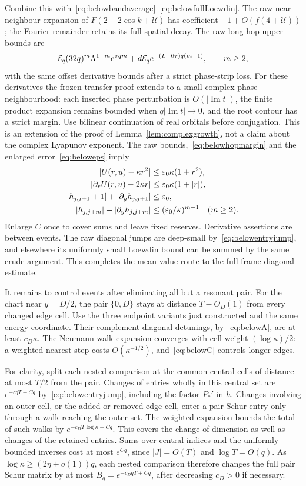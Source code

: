 Combine this with~\eqref{eq:belowbandaverage}--\eqref{eq:belowfullLoewdin}. The raw near-neighbour expansion of $F(2-2\cos k+\mathcal U)$ has coefficient $-1+O(f(4+\mathcal U))$; the Fourier remainder retains its full spatial decay. The raw long-hop upper bounds are
\[
 \mathcal E_q(32q)^m\Lambda^{1-m}e^{\tau qm}
       +d\mathcal E_q e^{-(L-6\tau)q(m-1)},\qquad m\ge2,
\]
with the same offset derivative bounds after a strict phase-strip loss.
For these derivatives the frozen transfer proof extends to a small complex phase neighbourhood: each inserted phase perturbation is $O(|\operatorname{Im}t|)$, the finite product expansion remains bounded when $q|\operatorname{Im}t|\to0$, and the root contour has a strict margin. Use bilinear continuation of real orbitals before conjugation. This is an extension of the proof of Lemma~\ref{lem:complexgrowth}, not a claim about the complex Lyapunov exponent.
The raw bounds,~\eqref{eq:belowhopmargin} and the enlarged error~\eqref{eq:beloweps} imply
\begin{align}
 |U(r,u)-\kappa r^2|&\le\varepsilon_0\kappa(1+r^2),\label{eq:belowA}\\
 |\partial_rU(r,u)-2\kappa r|&\le\varepsilon_0\kappa(1+|r|),\label{eq:belowAprime}\\
 |h_{j,j+1}+1|+|\partial_yh_{j,j+1}|&\le\varepsilon_0,\label{eq:belowB}\\
 |h_{j,j+m}|+|\partial_yh_{j,j+m}|&\le(\varepsilon_0/\kappa)^{m-1}
                         \quad(m\ge2).\label{eq:belowC}
\end{align}
Enlarge $C$ once to cover sums and leave fixed reserves. Derivative assertions are between events. The raw diagonal jumps are deep-small by~\eqref{eq:belowentryjump}, and elsewhere its uniformly small Loewdin bound can be summed by the same crude argument. This completes the mean-value route to the full-frame diagonal estimate.

It remains to control events after eliminating all but a resonant pair.
For the chart near $y=D/2$, the pair $\{0,D\}$ stays at distance $T-O_D(1)$ from every changed edge cell. Use the three endpoint variants just constructed and the same energy coordinate. Their complement diagonal detunings, by~\eqref{eq:belowA}, are at least $c_D\kappa$. The Neumann walk expansion converges with cell weight $(\log\kappa)/2$: a weighted nearest step costs $O(\kappa^{-1/2})$, and~\eqref{eq:belowC} controls longer edges.

For clarity, split each nested comparison at the common central cells of distance at most $T/2$ from the pair. Changes of entries wholly in this central set are $e^{-c qT+Cq}$ by~\eqref{eq:belowentryjump}, including the factor $P_*'$ in $h$. Changes involving an outer cell, or the added or removed edge cell, enter a pair Schur entry only through a walk reaching the outer set. The weighted expansion bounds the total of such walks by $e^{-c_D T\log\kappa+Cq}$. This covers the change of dimension as well as changes of the retained entries. Sums over central indices and the uniformly bounded inverses cost at most $e^{Cq}$, since $|J|=O(T)$ and $\log T=O(q)$. As $\log\kappa\ge(2\eta+o(1))q$, each nested comparison therefore changes the full pair Schur matrix by at most
$B_q=e^{-c_DqT+Cq}$, after decreasing $c_D>0$ if necessary.

